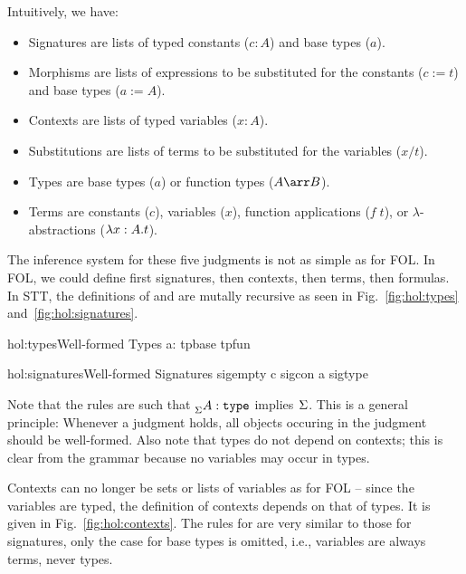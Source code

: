 Intuitively, we have:
\begin{itemize}
	\item Signatures are lists of typed constants ($c:A$) and base types ($a$).
	\item Morphisms are lists of expressions to be substituted for the constants ($c:=t$) and base types ($a:=A$).
	\item Contexts are lists of typed variables ($x:A$).
	\item Substitutions are lists of terms to be substituted for the variables ($x/t$).
	\item Types are base types ($a$) or function types ($A\arr B$).
	\item Terms are constants ($c$), variables ($x$), function applications ($f\;t$), or $\lambda$-abstractions ($\lambda x:A.t$).
\end{itemize}

The inference system for these five judgments is not as simple as for FOL. In FOL, we could define first signatures, then contexts, then terms, then formulas. In STT, the definitions of  and  are mutally recursive as seen in Fig.~\ref{fig:hol:types} and~\ref{fig:hol:signatures}.  

\begin{fignd}{hol:types}{Well-formed Types}
\ibnc{\issig{\Sigma}}
     {a:\TYPE \minn \Sigma}
     {}
     {tpbase}
\tb\tb
{}
     {}
     {}
     {tpfun}
\end{fignd}

\begin{fignd}{hol:signatures}{Well-formed Signatures}
\ianc{}
     {\issig{\cdot}}
     {sigempty}
\tb\tb
\icnc{\issig{\Sigma}}
     {c \mnot\minn \Sigma}
     {}
     {}
     {sigcon}
\tb\tb
\ibnc{\issig{\Sigma}}
     {a \mnot\minn \Sigma}
     {}
     {sigtype}
\end{fignd}

Note that the rules are such that $^{}_{\Sigma}A:\mathtt{type}$ implies $^{} \Sigma$. This is a general principle: Whenever a judgment holds, all objects occuring in the judgment should be well-formed. Also note that types do not depend on contexts; this is clear from the grammar because no variables may occur in types.


Contexts can no longer be sets or lists of variables as for FOL -- since the variables are typed, the definition of contexts depends on that of types. It is given in Fig.~\ref{fig:hol:contexts}. The rules for  are very similar to those for signatures, only the case for base types is omitted, i.e., variables are always terms, never types.


